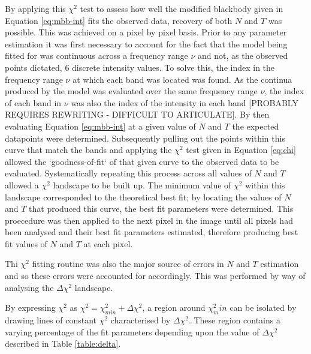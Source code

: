 \documentclass{report}
\begin{document}
By applying this $\chi^{2}$ test to assess how well the modified blackbody given in Equation \ref{eq:mbb-int} fits the observed data, recovery of both $N$ and $T$ was possible. This was achieved on a pixel by pixel basis. Prior to any parameter estimation it was first necessary to account for the fact that the model being fitted for was continuous across a frequency range $\nu$ and not, as the observed points dictated, 6 discrete intensity values. To solve this, the index in the frequency range $\nu$ at which each band was located was found. As the continua produced by the model was evaluated over the same frequency range $\nu$, the index of each band in $\nu$ was also the index of the intensity in each band [PROBABLY REQUIRES REWRITING - DIFFICULT TO ARTICULATE]. By then evaluating Equation \ref{eq:mbb-int} at a given value of $N$ and $T$ the expected datapoints were determined. Subsequently pulling out the points within this curve that match the bands and applying the $\chi^{2}$ test given in Equation \ref{eq:chi} allowed the `goodness-of-fit` of that given curve to the observed data to be evaluated. Systematically repeating this process across all values of
$N$ and $T$ allowed a $\chi^{2}$ landscape to be built up. The minimum value of $\chi^{2}$ within this landscape corresponded to the theoretical best fit; by locating the values of $N$ and $T$ that produced this curve, the best fit parameters were determined. This proecedure was then applied to the next pixel in the image until all pixels had been analysed and their best fit parameters estimated, therefore producing best fit values of $N$ and $T$ at each pixel.

Thi $\chi^{2}$ fitting routine was also the major source of errors in $N$ and $T$ estimation and so these errors were accounted for accordingly. This was performed by way of analysing the $\Delta \chi^{2}$ landscape.

By expressing $\chi^{2}$ as $\chi^{2} = \chi^{2}_{min} + \Delta \chi^{2}$, a region around $\chi^{2}_min$ can be isolated by drawing lines of constant $\chi^{2}$ characterised by $\Delta \chi^{2}$. These region contains a varying percentage of the fit parameters depending upon the value of $\Delta \chi^{2}$ described in Table \ref{table:delta}.
\end{document}

